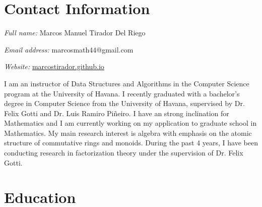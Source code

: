 \documentclass[12pt]{amsart}
\theoremstyle{definition}
\numberwithin{equation}{section}
\begin{document}
	
	
	
%	
%	
	
		

\date{\today}

	

\section{Contact Information}
	\textit{Full name:} Marcos Manuel Tirador Del Riego
	
	\textit{Email address:} marcosmath44@gmail.com
	
	\textit{Website:} \href{marcostirador.github.io}{marcostirador.github.io}
	
	\vspace{0.5cm}
	
I am an instructor of Data Structures and Algorithms in the Computer Science program at the University of Havana. I recently graduated with a bachelor's degree in Computer Science from the University of Havana, supervised by Dr. Felix Gotti and Dr. Luis Ramiro Piñeiro. I have an strong inclination for Mathematics and I am currently working on my application to graduate school in Mathematics. My main research interest is algebra with emphasis on the atomic structure of commutative rings and monoids. During the past 4 years, I have been conducting research in factorization theory under the supervision of Dr. Felix Gotti.
	
\section{Education}
\end{document}
